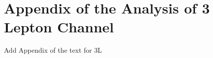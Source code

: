 \section{Appendix of the Analysis of 3 Lepton Channel }
\label{sec:AppAnaThreeL}
Add Appendix of the text for 3L 


